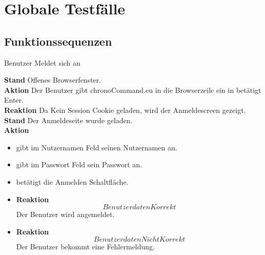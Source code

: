 \section{Globale Testfälle}

\subsection{Funktionssequenzen}
\begin{requirements}
	 Benutzer Meldet sich an
	\begin{requirements}
  			    \textbf{Stand} Offenes Browserfenster. \\
  			    \textbf{Aktion} Der Benutzer gibt chronoCommand.eu in die Browserzeile ein in betätigt Enter. \\
  			    \textbf{Reaktion} Da Kein Session Cookie geladen, wird der Anmeldescreen gezeigt.
  			    \textbf{Stand} Der Anmeldeseite wurde geladen.\\
                \textbf{Aktion}
                    \begin{itemize} Der Benutzer
                        \item gibt im Nutzernamen Feld seinen Nutzernamen an.
                        \item gibt im Passwort Feld sein Passwort an.
                        \item betätigt die Anmelden Schaltfläche.
                    \end{itemize}
                \begin{itemize}
			\item \textbf{Reaktion\[Benutzerdaten Korrekt\]} Der Benutzer wird angemeldet.
			\item \textbf{Reaktion\[Benutzerdaten Nicht Korrekt\]} Der Benutzer bekommt eine Fehlermeldung.
                \end{itemize}


\end{requirements}
\end{requirements}
